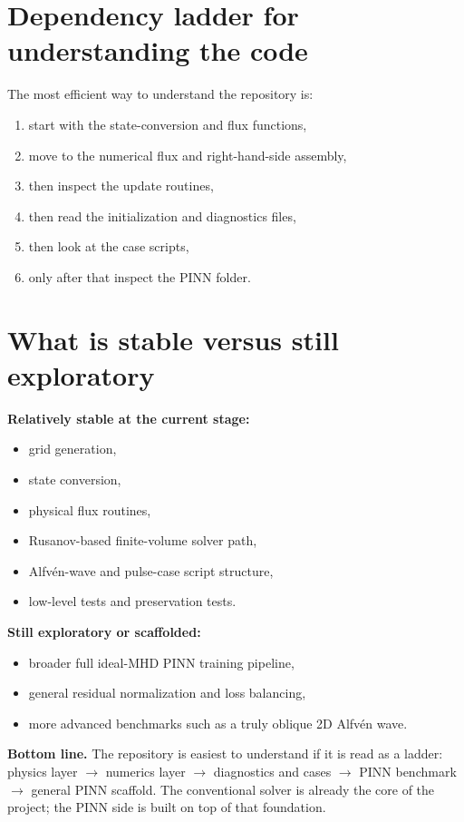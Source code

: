 \documentclass[11pt]{article}
\begin{document}
\section{Dependency ladder for understanding the code}
The most efficient way to understand the repository is:
\begin{enumerate}[leftmargin=1.8em]
    \item start with the state-conversion and flux functions,
    \item move to the numerical flux and right-hand-side assembly,
    \item then inspect the update routines,
    \item then read the initialization and diagnostics files,
    \item then look at the case scripts,
    \item only after that inspect the PINN folder.
\end{enumerate}

\section{What is stable versus still exploratory}
\textbf{Relatively stable at the current stage:}
\begin{itemize}[leftmargin=1.8em]
    \item grid generation,
    \item state conversion,
    \item physical flux routines,
    \item Rusanov-based finite-volume solver path,
    \item Alfv\'en-wave and pulse-case script structure,
    \item low-level tests and preservation tests.
\end{itemize}

\textbf{Still exploratory or scaffolded:}
\begin{itemize}[leftmargin=1.8em]
    \item broader full ideal-MHD PINN training pipeline,
    \item general residual normalization and loss balancing,
    \item more advanced benchmarks such as a truly oblique 2D Alfv\'en wave.
\end{itemize}

\begin{overviewbox}
\textbf{Bottom line.} The repository is easiest to understand if it is read as a ladder: physics layer $\rightarrow$ numerics layer $\rightarrow$ diagnostics and cases $\rightarrow$ PINN benchmark $\rightarrow$ general PINN scaffold. The conventional solver is already the core of the project; the PINN side is built on top of that foundation.
\end{overviewbox}
\end{document}

